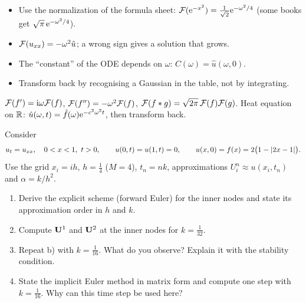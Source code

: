 \begin{solution}
\begin{trap}
\begin{itemize}
\item Use the normalization of the formula sheet: $\mathcal{F}(\mathrm{e}^{-x^2})=\frac1{\sqrt2}\mathrm{e}^{-\omega^2/4}$ (some books get $\sqrt\pi\,\mathrm{e}^{-\omega^2/4}$).
\item $\mathcal{F}(u_{xx})=-\omega^2\hat u$; a wrong sign gives a solution that grows.
\item The ``constant'' of the ODE depends on $\omega$: $C(\omega)=\hat u(\omega,0)$.
\item Transform back by recognising a Gaussian in the table, not by integrating.
\end{itemize}
\end{trap}
\begin{heart}
$\mathcal{F}(f')=\mathrm{i}\omega\mathcal{F}(f)$, $\mathcal{F}(f'')=-\omega^2\mathcal{F}(f)$, $\mathcal{F}(f\ast g)=\sqrt{2\pi}\,\mathcal{F}(f)\mathcal{F}(g)$.
Heat equation on $\mathbb{R}$: $\hat u(\omega,t)=\hat f(\omega)\mathrm{e}^{-c^2\omega^2t}$, then transform back.
\end{heart}
\end{solution}

Consider
\[
u_t=u_{xx},\quad 0<x<1,\ t>0,\qquad u(0,t)=u(1,t)=0,\qquad u(x,0)=f(x)=2\big(1-\abs{2x-1}\big).
\]
Use the grid $x_i=ih$, $h=\frac14$ ($M=4$), $t_n=nk$, approximations $U_i^n\approx u(x_i,t_n)$ and $\alpha=k/h^2$.
\begin{enumerate}
\item Derive the explicit scheme (forward Euler) for the inner nodes and state its approximation order in $h$ and $k$.
\item Compute $\mathbf{U}^1$ and $\mathbf{U}^2$ at the inner nodes for $k=\frac1{32}$.
\item Repeat b) with $k=\frac1{16}$. What do you observe? Explain it with the stability condition.
\item State the implicit Euler method in matrix form and compute one step with $k=\frac1{16}$. Why can this time step be used here?
\end{enumerate}


